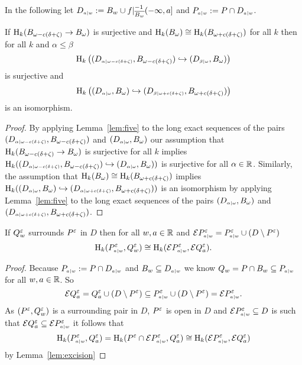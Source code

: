 
In the following let $D\subi{w}{a} := B_w\cup f\rest_{\comp{B_w}}^{-1}(-\infty,a]$ and $P\subi{w}{a} := P\cap D\subi{w}{a}$.

\begin{lemma}\label{lem:pt_interleaving}
  If $\hom_k(\b\to\B)$ is surjective and $\hom_k(\B)\cong \hom_k(B_{\omega+c(\delta+\zeta)})$ for all $k$ then for all $k$ and $\alpha\leq\beta$
  \[\hom_k\left((D\subi{\omega-c(\delta+\zeta)}{\alpha},B_{\omega-c(\delta+\zeta)})\hookrightarrow (D\subi{\omega}{\beta},B_{\omega})\right)\]
  is surjective and
  \[ \hom_k\left( (D\subi{\omega}{\alpha},B_\omega)\hookrightarrow (D\subi{\omega+c(\delta+\zeta)}{\beta},B_{\omega+c(\delta+\zeta)}) \right)\]
  is an isomorphism.
\end{lemma}
\begin{proof}
  By applying Lemma~\ref{lem:five} to the long exact sequences of the pairs $(D\subi{\omega-c(\delta+\zeta)}{\alpha},\b)$ and $(D\subi{\omega}{\alpha},\B)$ our assumption that $\hom_k(\b\to\B)$ is surjective for all $k$ implies $\hom_k((D\subi{\omega-c(\delta+\zeta)}{\alpha},\b)\hookrightarrow (D\subi{\omega}{\alpha},\B))$ is surjective for all $\alpha\in\R$.
  Similarly, the assumption that $\hom_k(\B)\cong \hom_k(B_{\omega+c(\delta+\zeta)})$ implies $\hom_k((D\subi{\omega}{\alpha},\B)\hookrightarrow (D\subi{\omega+c(\delta+\zeta)}{\alpha},B_{\omega+c(\delta+\zeta)}))$ is an isomorphism by applying Lemma~\ref{lem:five} to the long exact sequences of the pairs $(D\subi{\omega}{\alpha},\B)$ and $(D\subi{\omega+c(\delta+\zeta)}{\alpha},B_{\omega+c(\delta+\zeta)})$.
\end{proof}

\begin{lemma}\label{lem:extension_apply}
  If $Q_w^\e$ surrounds $P^\e$ in $D$ then for all $w,a\in\R$ and $\ext{P\subi{w}{a}^\e} = P\subi{w}{a}^\e \cup (D\setminus P^\e)$
  \[\hom_k(P\subi{w}{a}^\e, Q_w^\e)\cong \hom_k(\ext{P\subi{w}{a}^\e}, \ext{Q^\e_a}).\]
\end{lemma}
\begin{proof}
  Because $P\subi{w}{a} := P\cap D\subi{w}{a}$ and $B_w\subseteq D\subi{w}{a}$ we know $Q_w = P\cap B_w \subseteq P\subi{w}{a}$ for all $w,a\in\R$.
  So
  \[\ext{Q^\e_a} = Q^\e_a\cup (D\setminus P^\e) \subseteq P\subi{w}{a}^\e \cup (D\setminus P^\e) = \ext{P\subi{w}{a}^\e}.\]
  As $(P^\e, Q_w^\e)$ is a surrounding pair in $D$, $P^\e$ is open in $D$ and $\ext{P\subi{w}{a}^\e}\subseteq D$ is such that $\ext{Q^\e_a}\subseteq \ext{P\subi{w}{a}^\e}$ it follows that
  \[\hom_k(P\subi{w}{a}^\e, Q^\e_a) = \hom_k(P^\e\cap \ext{P\subi{w}{a}^\e}, Q^\e_a) \cong\hom_k(\ext{P\subi{w}{a}^\e}, \ext{Q^\e_a})\]
  by Lemma~\ref{lem:excision}
\end{proof}

